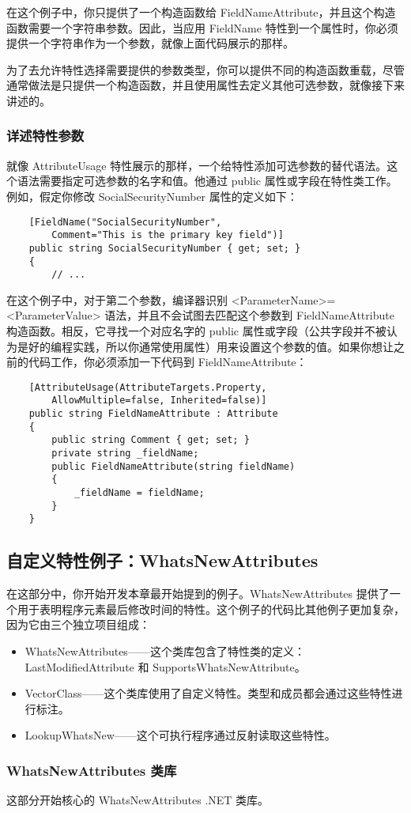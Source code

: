 在这个例子中，你只提供了一个构造函数给 FieldNameAttribute，并且这个构造函数需要一个字符串参数。因此，当应用 FieldName 特性到一个属性时，你必须提供一个字符串作为一个参数，就像上面代码展示的那样。

为了去允许特性选择需要提供的参数类型，你可以提供不同的构造函数重载，尽管通常做法是只提供一个构造函数，并且使用属性去定义其他可选参数，就像接下来讲述的。

\subsubsection{详述特性参数}
就像 AttributeUsage 特性展示的那样，一个给特性添加可选参数的替代语法。这个语法需要指定可选参数的名字和值。他通过 public 属性或字段在特性类工作。例如，假定你修改 SocialSecurityNumber 属性的定义如下：
\begin{verbatim}
    [FieldName("SocialSecurityNumber", 
        Comment="This is the primary key field")]
    public string SocialSecurityNumber { get; set; }
    {
        // ...
\end{verbatim}
在这个例子中，对于第二个参数，编译器识别 <ParameterName>=<ParameterValue> 语法，并且不会试图去匹配这个参数到 FieldNameAttribute 构造函数。相反，它寻找一个对应名字的 public 属性或字段（公共字段并不被认为是好的编程实践，所以你通常使用属性）用来设置这个参数的值。如果你想让之前的代码工作，你必须添加一下代码到 FieldNameAttribute：
\begin{verbatim}
    [AttributeUsage(AttributeTargets.Property,
        AllowMultiple=false, Inherited=false)]
    public string FieldNameAttribute : Attribute
    {
        public string Comment { get; set; }
        private string _fieldName;
        public FieldNameAttribute(string fieldName)
        {
            _fieldName = fieldName;
        }
    }
\end{verbatim}

\subsection{自定义特性例子：WhatsNewAttributes}
在这部分中，你开始开发本章最开始提到的例子。WhatsNewAttributes 提供了一个用于表明程序元素最后修改时间的特性。这个例子的代码比其他例子更加复杂，因为它由三个独立项目组成：
\begin{itemize}
    \item WhatsNewAttributes——这个类库包含了特性类的定义：LastModifiedAttribute 和 SupportsWhatsNewAttribute。
    \item VectorClass——这个类库使用了自定义特性。类型和成员都会通过这些特性进行标注。
    \item LookupWhatsNew——这个可执行程序通过反射读取这些特性。
\end{itemize}

\subsubsection{WhatsNewAttributes 类库}
这部分开始核心的 WhatsNewAttributes .NET 类库。